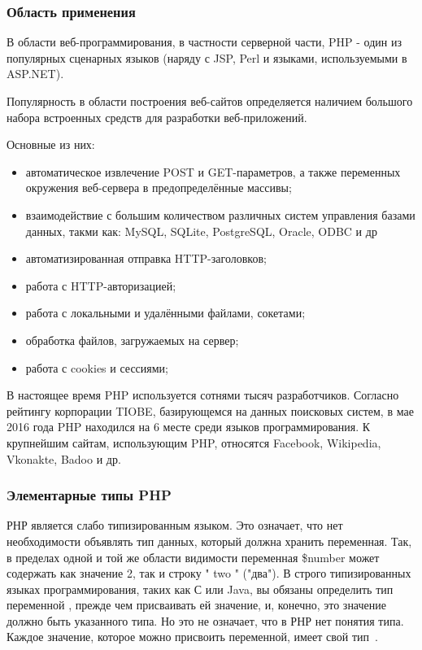 \subsubsection{Область применения }
\label{sub:practice:whereis_php}
В области веб-программирования, в частности серверной части, PHP - один из популярных сценарных языков (наряду с JSP, Perl и языками, используемыми в ASP.NET).

Популярность в области построения веб-сайтов определяется наличием большого набора встроенных средств для разработки веб-приложений. 

Основные из них:
\begin{itemize}
  \item автоматическое извлечение POST и GET-параметров, а также переменных окружения веб-сервера в предопределённые массивы;
  \item взаимодействие с большим количеством различных систем управления базами данных, такми как: MySQL,  SQLite, PostgreSQL, Oracle, ODBC и др
  \item автоматизированная отправка HTTP-заголовков;
  \item работа с HTTP-авторизацией;
  \item работа с локальными и удалёнными файлами, сокетами;
  \item обработка файлов, загружаемых на сервер;
  \item работа с cookies и сессиями;
\end{itemize}

В настоящее время PHP используется сотнями тысяч разработчиков. Согласно рейтингу корпорации TIOBE, базирующемся на данных поисковых систем, в мае 2016 года PHP находился на 6 месте среди языков программирования. К крупнейшим сайтам, использующим PHP, относятся Facebook, Wikipedia, Vkonakte, Badoo и др.



\subsubsection{Элементарные типы PHP }
\label{sub:practice:types_php}

РНР является слабо типизированным языком. Это означает, что нет необходимости объявлять тип данных, который должна хранить переменная. Так, в пределах одной и той же области видимости переменная \$number может содержать как значение 2, так и строку " two " ("два"). В строго типизированных языках программирования, таких как С или Java, вы обязаны определить тип переменной , прежде чем присваивать ей значение, и, конечно, это значение должно быть указанного типа. Но это не означает, что в РНР нет понятия типа. Каждое значение, которое можно присвоить переменной, имеет свой тип~\cite{zandstra_2015}.


